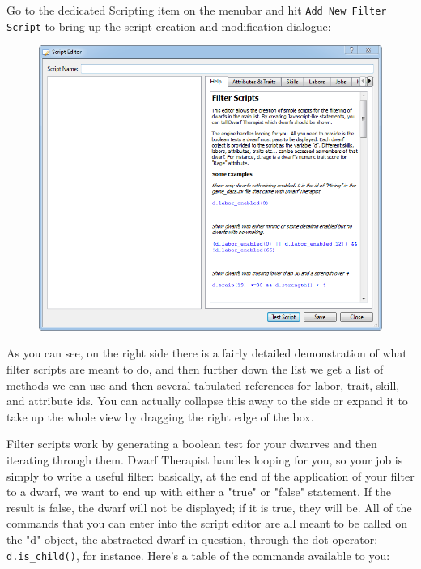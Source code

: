 \documentclass[]{article}
\begin{document}
Go to the dedicated Scripting item on the menubar and hit \texttt{Add New Filter Script} to bring up the
script creation and modification dialogue:

\begin{figure}[h!]
\vspace{-5pt}
\centering \includegraphics[scale=.81]{Sec4Fig1}
\vspace{-5pt}
\end{figure}

As you can see, on the right side there is a fairly detailed demonstration of what filter scripts are
meant to do, and then further down the list we get a list of methods we can use and then several
tabulated references for labor, trait, skill, and attribute ids. You can actually collapse this away to
the side or expand it to take up the whole view by dragging the right edge of the box.

Filter scripts work by generating a boolean test for your dwarves and then iterating through them. Dwarf
Therapist handles looping for you, so your job is simply to write a useful filter: basically, at the end
of the application of your filter to a dwarf, we want to end up with either a "true" or "false"
statement. If the result is false, the dwarf will not be displayed; if it is true, they will be. All of
the commands that you can enter into the script editor are all meant to be called on the "d" object, the
abstracted dwarf in question, through the dot operator: \texttt{d.is\_child()}, for instance. Here's a
table of the commands available to you:
\vspace{12pt}
\end{document}
